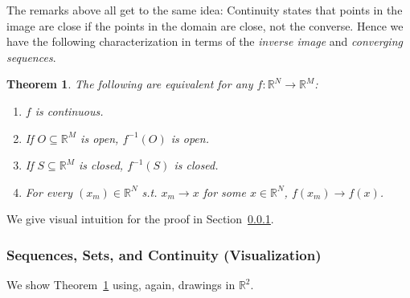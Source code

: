 \documentclass{article}
\newtheorem{theorem}{Theorem}
\theoremstyle{definition}
\begin{document}
The remarks above all get to the same idea: Continuity states that points in the image are close if the points in the domain are close, not the converse. Hence we have the following characterization in terms of the \textit{inverse image} and \textit{converging sequences}.
\begin{theorem}\label{thm:lecture2_continuity_open_closed}
  The following are equivalent for any $f: \mathbb{R}^N \to \mathbb{R}^M$:
  \begin{enumerate}
    \item[a)] $f$ is continuous.

    \item[b)] If $O \subseteq \mathbb{R}^M$ is open, $f^{-1}(O)$ is open.

    \item[c)] If $S \subseteq \mathbb{R}^M$ is closed, $f^{-1}(S)$ is closed.

    \item[d)] For every $(x_m) \in \mathbb{R}^N$ s.t. $x_m \to x$ for some $x \in \mathbb{R}^N$, $f(x_m) \to f(x)$.
  \end{enumerate}
\end{theorem}

We give visual intuition for the proof in Section~\ref{ssub:sets_and_continuity_visualization_}. 

\subsubsection{Sequences, Sets, and Continuity (Visualization)}
\label{ssub:sets_and_continuity_visualization_}

We show Theorem~\ref{thm:lecture2_continuity_open_closed} using, again, drawings in $\mathbb{R}^2$.
\end{document}
